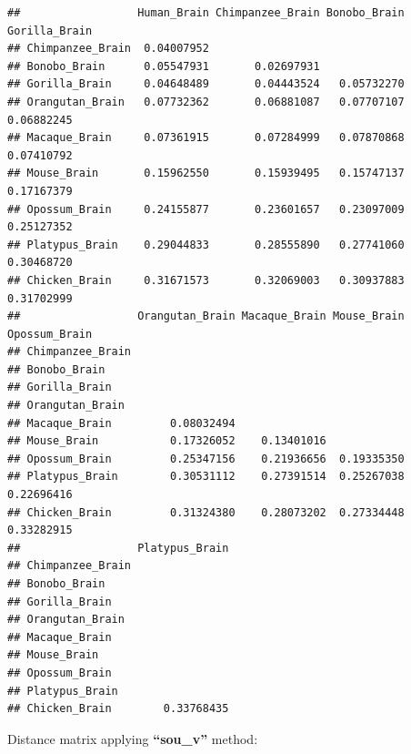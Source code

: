 \documentclass[]{book}
\newenvironment{Shaded}{\begin{snugshade}}{\end{snugshade}}
\newcommand{\DataTypeTok}[1]{\textcolor[rgb]{0.13,0.29,0.53}{#1}}
\newcommand{\KeywordTok}[1]{\textcolor[rgb]{0.13,0.29,0.53}{\textbf{#1}}}
\newcommand{\NormalTok}[1]{#1}
\newcommand{\OperatorTok}[1]{\textcolor[rgb]{0.81,0.36,0.00}{\textbf{#1}}}
\newcommand{\StringTok}[1]{\textcolor[rgb]{0.31,0.60,0.02}{#1}}
\begin{document}
\begin{verbatim}
##                  Human_Brain Chimpanzee_Brain Bonobo_Brain Gorilla_Brain
## Chimpanzee_Brain  0.04007952                                            
## Bonobo_Brain      0.05547931       0.02697931                           
## Gorilla_Brain     0.04648489       0.04443524   0.05732270              
## Orangutan_Brain   0.07732362       0.06881087   0.07707107    0.06882245
## Macaque_Brain     0.07361915       0.07284999   0.07870868    0.07410792
## Mouse_Brain       0.15962550       0.15939495   0.15747137    0.17167379
## Opossum_Brain     0.24155877       0.23601657   0.23097009    0.25127352
## Platypus_Brain    0.29044833       0.28555890   0.27741060    0.30468720
## Chicken_Brain     0.31671573       0.32069003   0.30937883    0.31702999
##                  Orangutan_Brain Macaque_Brain Mouse_Brain Opossum_Brain
## Chimpanzee_Brain                                                        
## Bonobo_Brain                                                            
## Gorilla_Brain                                                           
## Orangutan_Brain                                                         
## Macaque_Brain         0.08032494                                        
## Mouse_Brain           0.17326052    0.13401016                          
## Opossum_Brain         0.25347156    0.21936656  0.19335350              
## Platypus_Brain        0.30531112    0.27391514  0.25267038    0.22696416
## Chicken_Brain         0.31324380    0.28073202  0.27334448    0.33282915
##                  Platypus_Brain
## Chimpanzee_Brain               
## Bonobo_Brain                   
## Gorilla_Brain                  
## Orangutan_Brain                
## Macaque_Brain                  
## Mouse_Brain                    
## Opossum_Brain                  
## Platypus_Brain                 
## Chicken_Brain        0.33768435
\end{verbatim}

Distance matrix applying \textbf{``sou\_v''} method:

\begin{Shaded}
\end{Shaded}
\end{document}
